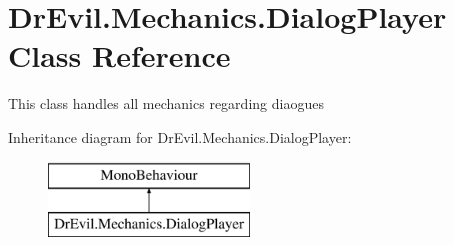 \hypertarget{class_dr_evil_1_1_mechanics_1_1_dialog_player}{}\section{Dr\+Evil.\+Mechanics.\+Dialog\+Player Class Reference}
\label{class_dr_evil_1_1_mechanics_1_1_dialog_player}


This class handles all mechanics regarding diaogues  


Inheritance diagram for Dr\+Evil.\+Mechanics.\+Dialog\+Player\+:\begin{figure}[H]
\begin{center}
\leavevmode
\includegraphics[height=2.000000cm]{class_dr_evil_1_1_mechanics_1_1_dialog_player}
\end{center}
\end{figure}
